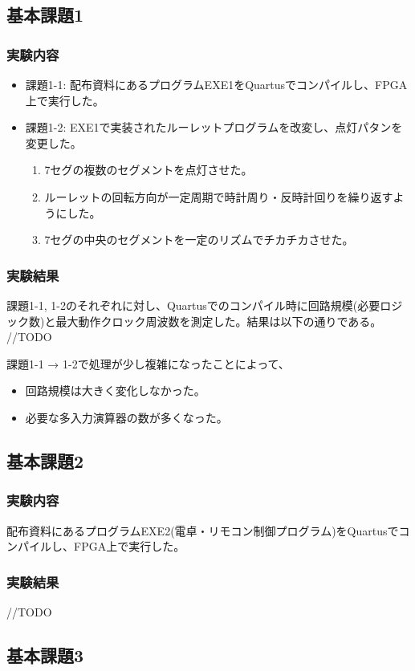 \subsection{基本課題1}
\subsubsection{実験内容}
\begin{itemize}
    \item 課題1-1: 配布資料にあるプログラムEXE1をQuartusでコンパイルし、FPGA上で実行した。
    \item 課題1-2: EXE1で実装されたルーレットプログラムを改変し、点灯パタンを変更した。
    \begin{enumerate}
        \item 7セグの複数のセグメントを点灯させた。
        \item ルーレットの回転方向が一定周期で時計周り・反時計回りを繰り返すようにした。
        \item 7セグの中央のセグメントを一定のリズムでチカチカさせた。
    \end{enumerate}
\end{itemize}
\subsubsection{実験結果}
課題1-1, 1-2のそれぞれに対し、Quartusでのコンパイル時に回路規模(必要ロジック数)と最大動作クロック周波数を測定した。結果は以下の通りである。
//TODO

課題1-1 → 1-2で処理が少し複雑になったことによって、
\begin{itemize}
    \item 回路規模は大きく変化しなかった。
    \item 必要な多入力演算器の数が多くなった。
\end{itemize}

\subsection{基本課題2}
\subsubsection{実験内容}
配布資料にあるプログラムEXE2(電卓・リモコン制御プログラム)をQuartusでコンパイルし、FPGA上で実行した。
\subsubsection{実験結果}
//TODO
\subsection{基本課題3}
